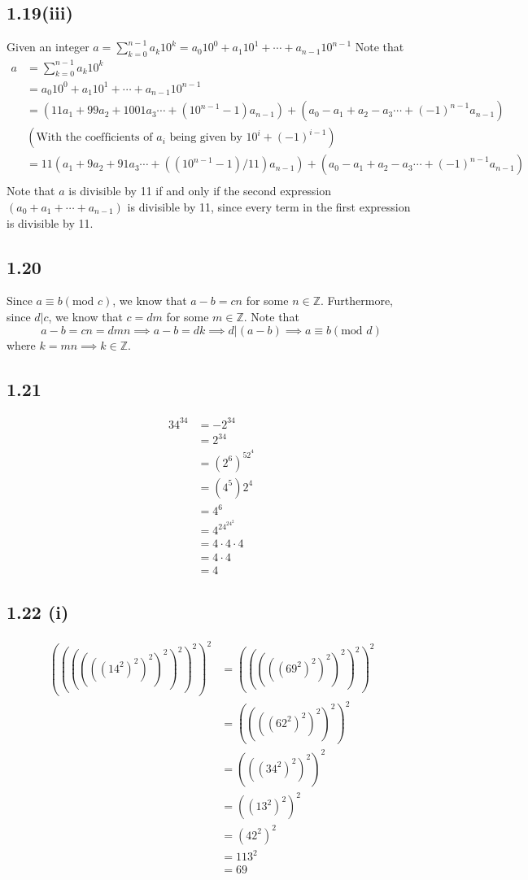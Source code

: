 \documentclass[letterpaper,12pt]{article}
\theoremstyle{definition}
\begin{document}
\subsection*{1.19(iii)}
Given an integer $a = \sum^{n-1}_{k = 0} a_k 10^k = a_0 10^0 +a_1 10^1 +\cdots +a_{n-1} 10^{n-1}$
Note that
\begin{align*}
    a &= \sum^{n-1}_{k = 0} a_k 10^k \\&= a_0 10^0 +a_1 10^1 +\cdots +a_{n-1}10^{n-1}
    \\&= (11a_1 +99a_2 + 1001a_3 \cdots +(10^{n-1}-1)a_{n-1}) + (a_0 - a_1 + a_2 - a_3\cdots + (-1)^{n-1}a_{n-1})\\
    &(\text{With the coefficients of $a_i$ being given by $10^{i} +(- 1)^{i-1}$})
    \\&= 11(a_1 +9a_2 + 91a_3 \cdots +((10^{n-1}-1)/11)a_{n-1}) + (a_0 - a_1 + a_2 - a_3\cdots + (-1)^{n-1}a_{n-1})\\
\end{align*}
Note that $a$ is divisible by 11 if and only if the second expression $(a_0 + a_1 +\cdots + a_{n-1})$ is divisible by 11, since every term in the first expression is divisible by 11.

\subsection*{1.20}
Since $a \equiv b (\text{mod }  c)$, we know that $a-b = cn$ for some $n \in \mathbb{Z} $. Furthermore, since $d \vert c$, we know that $c = dm$ for some $m \in \mathbb{Z} $. Note that 
\[ a-b = cn = dmn \implies a-b = dk \implies d \vert (a-b) \implies a \equiv b(\text{mod } d)\]
where $k = mn \implies k \in \mathbb{Z}$.

\subsection*{1.21}
\begin{align*}
    34^{34}&=-2^{34}
    \\&=2^{34}
    \\&=(2^6)^52^4
    \\&=(4^5)2^4
    \\&=4^6
    \\&=4^24^24^2
    \\&=4 \cdot 4 \cdot 4
    \\&=4 \cdot 4
    \\&=4
\end{align*}
\subsection*{1.22 (i)}
\begin{align*}
((((((14^2)^2)^2)^2)^2)^2)^2 &= (((((69^2)^2)^2)^2)^2)^2
\\&= ((((62^2)^2)^2)^2)^2
\\&= (((34^2)^2)^2)^2
\\&= ((13^2)^2)^2
\\&= (42^2)^2
\\&= 113^2
\\&= 69
\end{align*}
\end{document}
